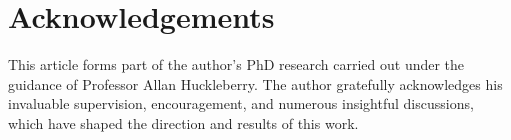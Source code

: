 \documentclass[12pt,a4paper]{article}
\theoremstyle{plain}
\theoremstyle{definition}
\theoremstyle{remark}
\begin{document}
\section*{Acknowledgements}

This article forms part of the author's PhD research carried out under the guidance of Professor Allan Huckleberry. 
The author gratefully acknowledges his invaluable supervision, encouragement, and numerous insightful discussions, 
which have shaped the direction and results of this work. 

\medskip

\printbibliography
\end{document}
